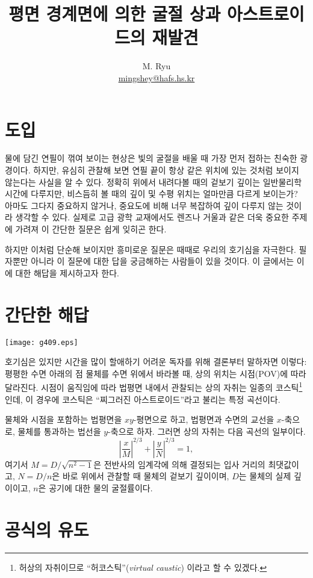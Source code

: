 \documentclass[twocolumn]{article}
\title{평면 경계면에 의한 굴절 상과 아스트로이드의 재발견}
\author{M. Ryu \\ {\href{mailto:mingshey@hafs.hs.kr}{mingshey@hafs.hs.kr}}}
\begin{document}
\maketitle
\section{도입}
물에 담긴 연필이 꺾여 보이는 현상은 빛의 굴절을 배울 때 가장 먼저 접하는 친숙한 광경이다. 
하지만, 유심히 관찰해 보면 연필 끝이 항상 같은 위치에 있는 것처럼 보이지 않는다는 사실을 
알 수 있다. 정확히 위에서 내려다볼 때의 겉보기 깊이는 일반물리학 시간에 다루지만, 비스듬히 볼 
때의 깊이 및 수평 위치는 얼마만큼 다르게 보이는가? 아마도 그다지 중요하지 않거나, 중요도에
비해 너무 복잡하여 깊이 다루지 않는 것이라 생각할 수 있다. 실제로 고급 광학 교재에서도 
렌즈나 거울과 같은 더욱 중요한 주제에 가려져 이 간단한 질문은 쉽게 잊히곤 한다.

하지만 이처럼 단순해 보이지만 흥미로운 질문은 때때로 우리의 호기심을 자극한다. 필자뿐만 
아니라 이 질문에 대한 답을 궁금해하는 사람들이 있을 것이다. 이 글에서는 이에 대한 해답을 
제시하고자 한다.

\section{간단한 해답}

\hfill \texttt{[image: g409.eps]} \hfill\null

호기심은 있지만 시간을 많이 할애하기 어려운 독자를 위해 결론부터 말하자면 이렇다:  
평평한 수면 아래의 점 물체를 수면 위에서 바라볼 때, 상의 위치는 시점(POV)에 따라 달라진다. 
시점이 움직임에 따라 법평면 내에서 관찰되는 상의 자취는 일종의  코스틱\footnote{허상의 
자취이므로 ``허코스틱''(\emph{virtual caustic}) 이라고 할 수 있겠다.}인데, 이 경우에 
코스틱은 ``찌그러진 아스트로이드''라고 불리는 특정 곡선이다.
	
물체와 시점을 포함하는 법평면을 $xy$-평면으로 하고, 법평면과 수면의 교선을 $x$-축으로, 
물체를 통과하는 법선을 $y$-축으로 하자. 그러면 상의 자취는 다음 곡선의 일부이다.
	$$ \left| \dfrac{x}{M} \right| ^ {2/3} 
	+ \left| \dfrac{y}{N} \right| ^ {2/3} = 1,$$
여기서 $M = D/\sqrt{n^2 - 1}$은 전반사의 임계각에 의해 결정되는 입사 거리의 최댓값이고, 
$N = D/n$은 바로 위에서 관찰할 때 물체의 겉보기 깊이이며, 
$D$는 물체의 실제 깊이이고, $n$은 공기에 대한 물의 굴절률이다.
	
\section{공식의 유도}
	
\end{document}
